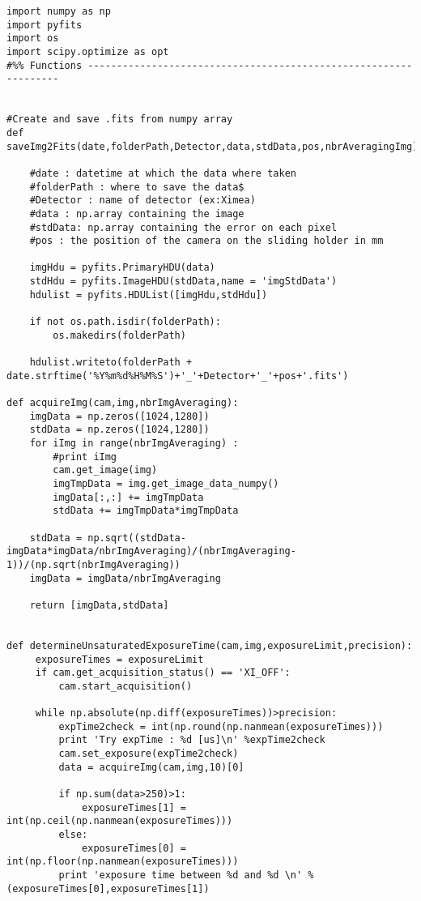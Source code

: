 \begin{lstlisting}
import numpy as np
import pyfits
import os
import scipy.optimize as opt
#%% Functions -----------------------------------------------------------------


#Create and save .fits from numpy array
def saveImg2Fits(date,folderPath,Detector,data,stdData,pos,nbrAveragingImg):

    #date : datetime at which the data where taken
    #folderPath : where to save the data$
    #Detector : name of detector (ex:Ximea)
    #data : np.array containing the image
    #stdData: np.array containing the error on each pixel
    #pos : the position of the camera on the sliding holder in mm

    imgHdu = pyfits.PrimaryHDU(data)
    stdHdu = pyfits.ImageHDU(stdData,name = 'imgStdData')
    hdulist = pyfits.HDUList([imgHdu,stdHdu])

    if not os.path.isdir(folderPath):
        os.makedirs(folderPath)

    hdulist.writeto(folderPath + date.strftime('%Y%m%d%H%M%S')+'_'+Detector+'_'+pos+'.fits')

def acquireImg(cam,img,nbrImgAveraging):
    imgData = np.zeros([1024,1280])
    stdData = np.zeros([1024,1280])
    for iImg in range(nbrImgAveraging) :
        #print iImg
        cam.get_image(img)
        imgTmpData = img.get_image_data_numpy()
        imgData[:,:] += imgTmpData
        stdData += imgTmpData*imgTmpData

    stdData = np.sqrt((stdData-imgData*imgData/nbrImgAveraging)/(nbrImgAveraging-1))/(np.sqrt(nbrImgAveraging))
    imgData = imgData/nbrImgAveraging

    return [imgData,stdData]


def determineUnsaturatedExposureTime(cam,img,exposureLimit,precision):
     exposureTimes = exposureLimit
     if cam.get_acquisition_status() == 'XI_OFF':
         cam.start_acquisition()

     while np.absolute(np.diff(exposureTimes))>precision:
         expTime2check = int(np.round(np.nanmean(exposureTimes)))
         print 'Try expTime : %d [us]\n' %expTime2check
         cam.set_exposure(expTime2check)
         data = acquireImg(cam,img,10)[0]

         if np.sum(data>250)>1:
             exposureTimes[1] = int(np.ceil(np.nanmean(exposureTimes)))
         else:
             exposureTimes[0] = int(np.floor(np.nanmean(exposureTimes)))
         print 'exposure time between %d and %d \n' %(exposureTimes[0],exposureTimes[1])


\end{lstlisting}
